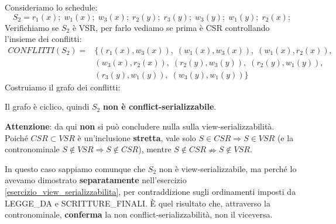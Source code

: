 \documentclass[a4paper,twoside]{article}
\begin{document}
\begin{example}
  Consideriamo lo schedule:
  \[
    S_2 = r_1(x); \; w_1(x); \; w_3(x); \; r_2(y); \; r_3(y); \; w_3(y); \; w_1(y); \;
    r_2(x);
  \] 
  Verifichiamo se \( S_2 \) è VSR, per farlo vediamo se prima è CSR controllando
  l'insieme dei conflitti:
  \[
    \begin{aligned}
      CONFLITTI(S_2) =& 
      \{
        (r_1(x), w_3(x)),\;
        (w_1(x), w_3(x)),\;
        (w_1(x), r_2(x)), \\
                             &(w_3(x), r_2(x)),\;
                             (r_2(y), w_3(y)),\;
                             (r_2(y), w_1(y)), \\
                             &(r_3(y), w_1(y)),\;
                             (w_3(y), w_1(y))
                           \} 
    \end{aligned}
  \]
  Costruiamo il grafo dei conflitti:
  \begin{figure}[H]
    \centering
  \end{figure}
  \noindent
  Il grafo è ciclico, quindi \( S_2 \) \textbf{non è conflict-serializzabile}.

  \vspace{1em}
  \noindent
  \textbf{Attenzione}: da qui \textbf{non} si può concludere nulla sulla
  view-serializzabilità. Poiché \( CSR \subset VSR \) è un'inclusione
  \textbf{stretta}, vale solo \( S \in CSR \Rightarrow S \in VSR \) (e la
  contronominale \( S \notin VSR \Rightarrow S \notin CSR \)), mentre
  \( S \notin CSR \nRightarrow S \notin VSR \).

  \vspace{1em}
  \noindent
  In questo caso sappiamo comunque che \( S_2 \) non è view-serializzabile, ma perché
  lo avevamo dimostrato \textbf{separatamente} nell'esercizio
  \ref{esercizio_view_serializzabilita}, per contraddizione sugli ordinamenti imposti
  da LEGGE\_DA e SCRITTURE\_FINALI. È quel risultato che, attraverso la
  contronominale, \textbf{conferma} la non conflict-serializzabilità, non il
  viceversa.
\end{example}
\end{document}

